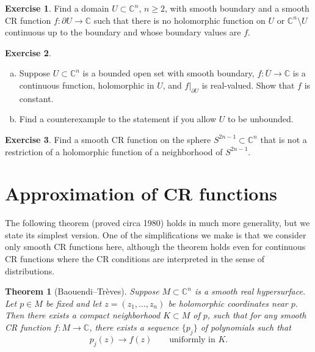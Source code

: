 \documentclass[12pt,openany]{book}
\newcommand{\C}{{\mathbb{C}}}
\theoremstyle{plain}
\newtheorem{thm}{Theorem}[section]
\theoremstyle{remark}
\theoremstyle{definition}
\newenvironment{exbox}{%
    \def\FrameCommand{\vrule width 1pt \relax\hspace {10pt}}%
    \MakeFramed {\advance \hsize -\width \FrameRestore }%
}{%
    \endMakeFramed
}
\newenvironment{exparts}{%
    \leavevmode\begin{enumerate}[a),noitemsep,topsep=0pt,parsep=0pt,partopsep=0pt]
}{%
    \end{enumerate}
}
\theoremstyle{exercise}
\newtheorem{exercise}{Exercise}[section]
\theoremstyle{example}
\begin{document}
\begin{exbox}
\begin{exercise}
Find a domain $U \subset \C^n$, $n \geq 2$, with smooth boundary and a smooth
CR function $f \colon \partial U \to \C$ such that there is no holomorphic function
on $U$ or $\C^n \setminus U$ continuous up to the boundary and whose boundary values are $f$.
\end{exercise}

\begin{exercise}
\begin{exparts}
\item
Suppose $U \subset \C^n$ is a bounded open set with smooth boundary,
$f \colon \overline{U} \to \C$ is a continuous function, holomorphic in
$U$, and $f|_{\partial U}$ is real-valued.  Show that $f$ is
constant.
\item
Find a counterexample to the statement if you allow $U$
to be unbounded.
\end{exparts}
\end{exercise}

\begin{exercise}
Find a smooth CR function on the sphere $S^{2n-1} \subset \C^n$ that is not
a restriction of a holomorphic function of a neighborhood of $S^{2n-1}$.
\end{exercise}
\end{exbox}


\section{Approximation of CR functions}

The following theorem (proved circa 1980) holds in much more generality, but
we state its simplest version.  One of the simplifications we make is that
we consider only smooth CR functions here, although the theorem holds even
for continuous CR functions where the CR conditions are interpreted in the
sense of distributions.

\pagebreak[2]
\begin{thm}[Baouendi--Tr{\`e}ves]%
Suppose $M \subset \C^n$ is a smooth real hypersurface.
Let $p \in M$ be fixed and let $z=(z_1,\ldots,z_n)$ be holomorphic
coordinates near $p$.
Then there exists a compact
neighborhood $K \subset M$ of $p$, such that for any smooth CR function $f \colon M \to \C$,
there exists a sequence $\{ p_j \}$ of polynomials such that
\begin{equation*}
p_j(z) \to f(z)
\qquad \text{uniformly in $K$.}
\end{equation*}
\end{thm}
\end{document}
